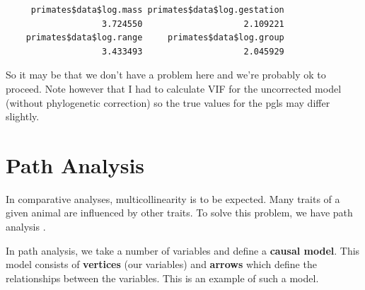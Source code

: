 \documentclass[
]{book}
\newenvironment{Shaded}{\begin{snugshade}}{\end{snugshade}}
\newcommand{\FloatTok}[1]{\textcolor[rgb]{0.00,0.00,0.81}{#1}}
\newcommand{\KeywordTok}[1]{\textcolor[rgb]{0.13,0.29,0.53}{\textbf{#1}}}
\newcommand{\NormalTok}[1]{#1}
\newcommand{\OperatorTok}[1]{\textcolor[rgb]{0.81,0.36,0.00}{\textbf{#1}}}
\newcommand{\StringTok}[1]{\textcolor[rgb]{0.31,0.60,0.02}{#1}}
\begin{document}
\begin{Shaded}
\end{Shaded}

\begin{verbatim}
     primates$data$log.mass primates$data$log.gestation 
                   3.724550                    2.109221 
    primates$data$log.range     primates$data$log.group 
                   3.433493                    2.045929 
\end{verbatim}

So it may be that we don't have a problem here and we're probably ok to proceed. Note however that I had to calculate VIF for the uncorrected model (without phylogenetic correction) so the true values for the pgls may differ slightly.

\hypertarget{path-analysis}{%
\section{Path Analysis}\label{path-analysis}}

In comparative analyses, multicollinearity is to be expected. Many traits of a given animal are influenced by other traits. To solve this problem, we have path analysis \citep{Hardenberg13, Gonzalez14}.

In path analysis, we take a number of variables and define a \textbf{causal model}. This model consists of \textbf{vertices} (our variables) and \textbf{arrows} which define the relationships between the variables. This is an example of such a model.
\end{document}
